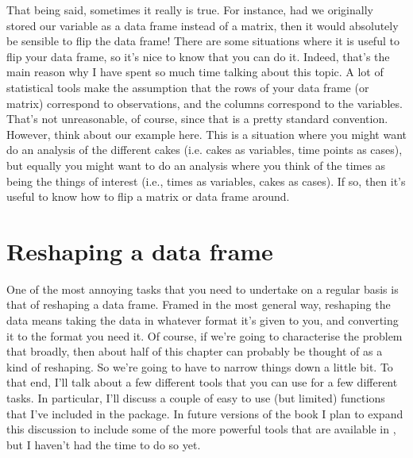 That being said, sometimes it really is true. For instance, had we originally stored our  variable as a data frame instead of a matrix, then it would absolutely be sensible to flip the data frame! There are some situations where it is useful to flip your data frame, so it's nice to know that you can do it. Indeed, that's the main reason why I have spent so much time talking about this topic. A lot of statistical tools make the assumption that the rows of your data frame (or matrix) correspond to observations, and the columns correspond to the variables. That's not unreasonable, of course, since that is a pretty standard convention. However, think about our  example here. This is a situation where you might want do an analysis of the different cakes (i.e. cakes as variables, time points as cases), but equally you might want to do an analysis where you think of the times as being the things of interest (i.e., times as variables, cakes as cases). If so, then it's useful to know how to flip a matrix or data frame around.





\section{Reshaping a data frame\label{sec:reshape}}

One of the most annoying tasks that you need to undertake on a regular basis is that of reshaping a data frame. Framed in the most general way, reshaping the data means taking the data in whatever format it's given to you, and converting it to the format you need it. Of course, if we're going to characterise the problem that broadly, then about half of this chapter can probably be thought of as a kind of reshaping. So we're going to have to narrow things down a little bit. To that end, I'll talk about a few different tools that you can use for a few different tasks. In particular, I'll discuss a couple of easy to use (but limited) functions that I've included in the  package. In future versions of the book I plan to expand this discussion to include some of the more powerful tools that are available in \R, but I haven't had the time to do so yet.


